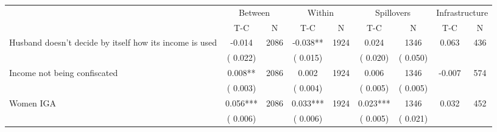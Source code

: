 
\begin{tabular}{l*{8}{c}}\hline&\multicolumn{2}{c}{Between}&\multicolumn{2}{c}{Within}&\multicolumn{2}{c}{Spillovers}&\multicolumn{2}{c}{Infrastructure}\\ \cmidrule(r){2-3}\cmidrule(l){4-5}\cmidrule(l){6-7}\cmidrule(l){8-9} & {T-C} & {N} & {T-C} & {N}  & {T-C}  & {N} & {T-C}  & {N} \\ \midrule
Husband doesn't decide by itself how its income is used        &             -0.014      &       2086       &             -0.038**      &       1924       &              0.024      &       1346  &        0.063 &       436       \\
                       &       (       0.022)            &                               &       (       0.015)            &                               &       (       0.020)            &       (       0.050) &                  \\
Income not being confiscated        &              0.008**      &       2086       &              0.002      &       1924       &              0.006      &       1346  &       -0.007 &       574       \\
                       &       (       0.003)            &                               &       (       0.004)            &                               &       (       0.005)            &       (       0.005) &                  \\
Women IGA        &              0.056***      &       2086       &              0.033***      &       1924       &              0.023***      &       1346  &        0.032 &       452       \\
                       &       (       0.006)            &                               &       (       0.006)            &                               &       (       0.005)            &       (       0.021) &                  \\
\hline \end{tabular}